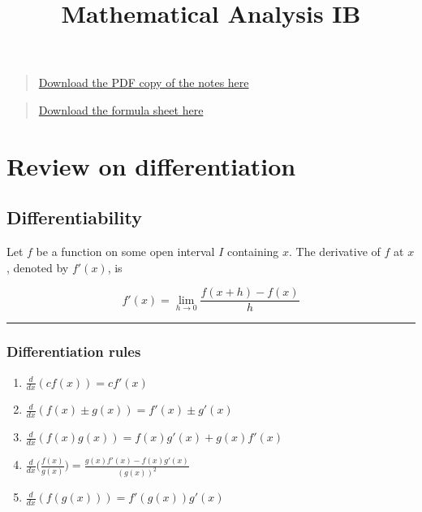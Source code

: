 \documentclass[
]{article}
\title{Mathematical Analysis IB}
\author{}
\date{\vspace{-2.5em}}
\begin{document}
\maketitle

\begin{quote}
\href{../math-31.2/notes.pdf}{Download the PDF copy of the notes here}
\end{quote}

\begin{quote}
\href{../math-31.2/formulas.pdf}{Download the formula sheet here}
\end{quote}

\hypertarget{review-on-differentiation}{%
\section*{Review on differentiation}\label{review-on-differentiation}}

\hypertarget{differentiability}{%
\subsection{Differentiability}\label{differentiability}}

Let \(f\) be a function on some open interval \(I\) containing \(x\).
The derivative of \(f\) at \(x\), denoted by \(f'(x)\), is

\[ f'(x) = \lim_{h\to 0}\frac{f(x+h)-f(x)}{h} \]

\begin{center}\rule{0.5\linewidth}{0.5pt}\end{center}

\hypertarget{differentiation-rules}{%
\subsubsection{Differentiation rules}\label{differentiation-rules}}

\begin{enumerate}
\def\labelenumi{\arabic{enumi}.}
\item
  \(\displaystyle\frac{d}{dx}(cf(x))= cf'(x)\)
\item
  \(\displaystyle\frac{d}{dx}(f(x) \pm g(x)) = f'(x) \pm g'(x)\)
\item
  \(\displaystyle\frac{d}{dx}(f(x)g(x)) = f(x)g'(x) + g(x)f'(x)\)
\item
  \(\displaystyle\frac{d}{dx}\Big(\frac{f(x)}{g(x)}\Big) = \frac{g(x)f'(x)-f(x)g'(x)}{(g(x))^2}\)
\item
  \(\displaystyle\frac{d}{dx}(f(g(x))) = f'(g(x))g'(x)\)
\end{enumerate}
\end{document}
